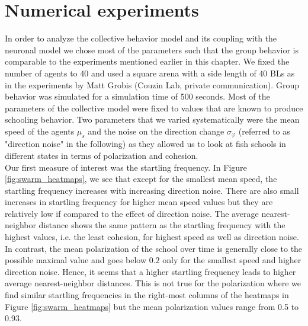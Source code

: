 \documentclass[a4paper,10pt,hidelinks]{scrreprt}
\begin{document}
    \section{Numerical experiments}
    In order to analyze the collective behavior model and its coupling with the neuronal model we chose most of the parameters such that the group behavior is comparable to the experiments mentioned earlier in this chapter.
    We fixed the number of agents to 40 and used a square arena with a side length of 40 BLs as in the experiments by Matt Grobis (Couzin Lab, private communication).
    Group behavior was simulated for a simulation time of 500 seconds.
    Most of the parameters of the collective model were fixed to values that are known to produce schooling behavior.
    Two parameters that we varied systematically were the mean speed of the agents $\mu_{s}$ and the noise on the direction change $\sigma_{\varphi}$ (referred to as "direction noise" in the following) as they allowed us to look at fish schools in different states in terms of polarization and cohesion.\\
    Our first measure of interest was the startling frequency.
    In Figure \ref{fig:swarm_heatmaps}, we see that except for the smallest mean speed, the startling frequency increases with increasing direction noise.
    There are also small increases in startling frequency for higher mean speed values but they are relatively low if compared to the effect of direction noise.
    The average nearest-neighbor distance shows the same pattern as the startling frequency with the highest values, i.e. the least cohesion, for highest speed as well as direction noise.
    In contrast, the mean polarization of the school over time is generally close to the possible maximal value and goes below $0.2$ only for the smallest speed and higher direction noise.
    Hence, it seems that a higher startling frequency leads to higher average nearest-neighbor distances.
    This is not true for the polarization where we find similar startling frequencies in the right-most columns of the heatmaps in Figure \ref{fig:swarm_heatmaps} but the mean polarization values range from 0.5 to 0.93.\\
\end{document}
